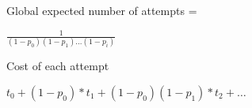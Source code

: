 \documentclass[fleqn]{article}
\begin{document}
Global expected number of attempts =

$ \frac{1}{ (1-p_0)(1-p_1)...(1-p_i) } $

Cost of each attempt 

$ t_0 + (1-p_0)*t_1 + (1-p_0)(1-p_1)*t_2 + \dots $
\end{document}
